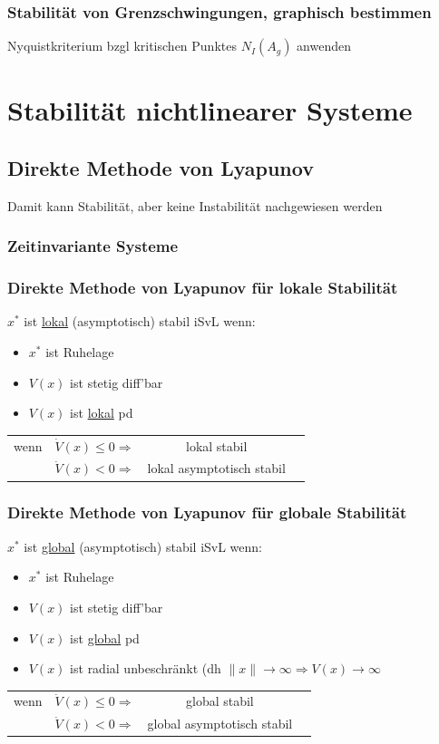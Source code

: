 \documentclass[german]{latex4ei/latex4ei_sheet}
\begin{document}
\subsubsection*{Stabilität von Grenzschwingungen, graphisch bestimmen}

Nyquistkriterium bzgl kritischen Punktes $N_I(A_g)$ anwenden

\section{Stabilität nichtlinearer Systeme}

\subsection{Direkte Methode von Lyapunov}
Damit kann Stabilität, aber keine Instabilität nachgewiesen werden

\subsubsection*{Zeitinvariante Systeme}

\subsubsection*{Direkte Methode von Lyapunov für lokale Stabilität}

$x^*$ ist \underline{lokal} (asymptotisch) stabil iSvL wenn:
\begin{itemize}
  \item $x^*$ ist Ruhelage
  \item $V(x)$ ist stetig diff'bar
  \item $V(x)$ ist \underline{lokal} pd
\end{itemize}
\begin{tabular}{cccc}
  wenn  &$\dot{V}(x) \leq 0 \Rightarrow$& lokal stabil \\
   &$\dot{V}(x) < 0 \Rightarrow $& lokal asymptotisch stabil
\end{tabular}

\subsubsection*{Direkte Methode von Lyapunov für globale Stabilität}

$x^*$ ist \underline{global} (asymptotisch) stabil iSvL wenn:
\begin{itemize}
  \item $x^*$ ist Ruhelage
  \item $V(x)$ ist stetig diff'bar
  \item $V(x)$ ist \underline{global} pd
  \item $V(x)$ ist radial unbeschränkt (dh $\|x\| \rightarrow \infty \Rightarrow V(x) \rightarrow \infty$
\end{itemize}
\begin{tabular}{cccc}
  wenn  &$\dot{V}(x) \leq 0 \Rightarrow$& global stabil \\
   &$\dot{V}(x) < 0 \Rightarrow $& global asymptotisch stabil
\end{tabular}
\end{document}
